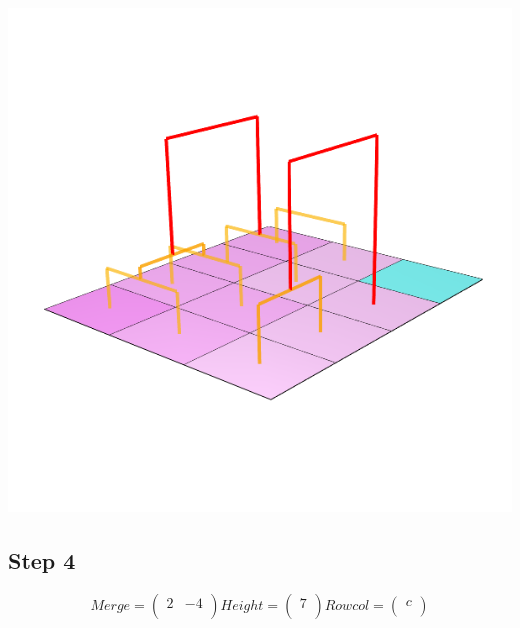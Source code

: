 \documentclass{article}
\begin{document}
\centering \includegraphics[scale=0.3]{Merge3}

\raggedright\subsection{Step 4}
\[
Merge =  \left(\begin{array}{cc}
2 & -4 \\
\end{array} \right)
%
Height = \left( \begin{array}{c}
7 \\
\end{array} \right)
%
Rowcol = \left( \begin{array}{c}
c \\
\end{array} \right)
\]  
\end{document}
